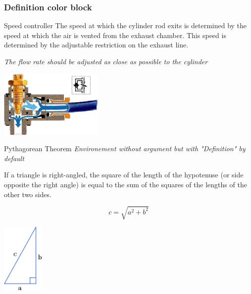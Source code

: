       \subsubsection{Definition color block}
      \noindent \begin{definition}{Speed controller}
        The speed at which the cylinder rod exits is determined by the speed at which the air is vented from the exhaust chamber. This speed is determined by the adjustable restriction on the exhaust line.


        \begin{multicols}{2}
          
          \begin{vertAlign}
            \centering \textit{The flow rate should be adjusted as close as possible to the cylinder}
          \end{vertAlign}

          \begin{vertAlign}
            \centering \includegraphics[width=5cm]{assets/auxiVitesse.png}
          \end{vertAlign}
        \end{multicols}
      \end{definition}
      \noindent \begin{definition*}{Pythagorean Theorem \textit{Environement without argument but with "Definition" by default}}
       
        \begin{multicols}{2}
          
          \begin{vertAlign}
            If a triangle is right-angled, the square of the length of the hypotenuse (or side opposite the right angle) is equal to the sum of the squares of the lengths of the other two sides.

            \begin{equation*}
              c=\sqrt{a^2+b^2}
            \end{equation*}
          \end{vertAlign}

          \columnbreak

          \begin{vertAlign}
            \centering \includegraphics[width=2cm]{assets/pythagoreanTheorem.png}
          \end{vertAlign}
        \end{multicols}
      \end{definition*}

